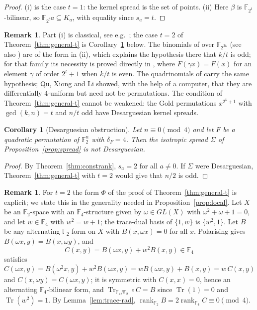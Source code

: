 \documentclass[11pt]{article}
\newtheorem{corollary}[theorem]{Corollary}
\theoremstyle{definition}
\newtheorem{remark}[theorem]{Remark}
\newcommand{\F}{\mathbb{F}}
\DeclareMathOperator{\Tr}{Tr}
\DeclareMathOperator{\rk}{rank}
\begin{document}
\begin{proof}
(i) is the case $t=1$: the kernel spread is the set of points. (ii) Here $\beta$ is
$\F_{2^t}$-bilinear, so $\F_{2^t}a\subseteq K_a$, with equality since $s_a=t$.
\end{proof}
\begin{remark}
Part (i) is classical, see e.g.\ \cite{Carlet21}; the case $t=2$ of Theorem~\ref{thm:general-t}
is Corollary~\ref{thm:desarg} below. The binomials of \cite[Theorem~1.2]{BTT12} over
$\F_{2^{3k}}$ (see also \cite[Theorem~9]{CP19}) are of the form in (ii), which explains the
hypothesis there that $k/t$ is odd; for that family its necessity is proved directly in
\cite[Lemma~2.1]{BTT12}, where $F(\gamma x)=F(x)$ for an element $\gamma$ of order $2^t+1$ when
$k/t$ is even. The quadrinomials of \cite[Problem~5.1]{BTT12} carry the same hypothesis; Qu,
Xiong and Li \cite{QXL13} showed, with the help of a computer, that they are differentially
$4$-uniform but need not be permutations. The
condition of Theorem~\ref{thm:general-t} cannot be weakened: the Gold permutations $x^{2^k+1}$
with $\gcd(k,n)=t$ and $n/t$ odd have Desarguesian kernel spreads.
\end{remark}

\begin{corollary}[Desarguesian obstruction]\label{thm:desarg}
Let $n\equiv 0\pmod 4$ and let $F$ be a quadratic permutation of $\F_2^n$ with
$\delta_F=4$. Then the isotropic spread $\Sigma$ of Proposition~\ref{prop:spread} is not
Desarguesian.
\end{corollary}
\begin{proof}
By Theorem~\ref{thm:constrank}, $s_a=2$ for all $a\neq0$. If $\Sigma$ were Desarguesian,
Theorem~\ref{thm:general-t} with $t=2$ would give that $n/2$ is odd.
\end{proof}
\begin{remark}\label{rem:F4form}
For $t=2$ the form $\Phi$ of the proof of Theorem~\ref{thm:general-t} is explicit; we state this
in the generality needed in Proposition~\ref{prop:local}. Let $X$ be an $\F_2$-space with an
$\F_4$-structure given by $\omega\in GL(X)$ with $\omega^2+\omega+1=0$, and let $w\in\F_4$
with $w^2=w+1$; the trace-dual basis of $\{1,w\}$ is $\{w^2,1\}$. Let $B$ be any
alternating $\F_2$-form on $X$ with $B(x,\omega x)=0$ for all $x$. Polarising gives
$B(\omega x,y)=B(x,\omega y)$, and
\[
C(x,y)=B(\omega x,y)+w^2B(x,y)\in\F_4
\]
satisfies $C(\omega x,y)=B(\omega^2x,y)+w^2B(\omega x,y)=wB(\omega x,y)+B(x,y)=w\,C(x,y)$ and
$C(x,\omega y)=C(\omega x,y)$; it is symmetric with $C(x,x)=0$, hence an alternating
$\F_4$-bilinear form, and $\Tr_{\F_4/\F_2}\circ C=B$ since $\Tr(1)=0$ and $\Tr(w^2)=1$. By
Lemma~\ref{lem:trace-rad}, $\rk_{\F_2}B=2\rk_{\F_4}C\equiv0\pmod4$.
\end{remark}
\end{document}
